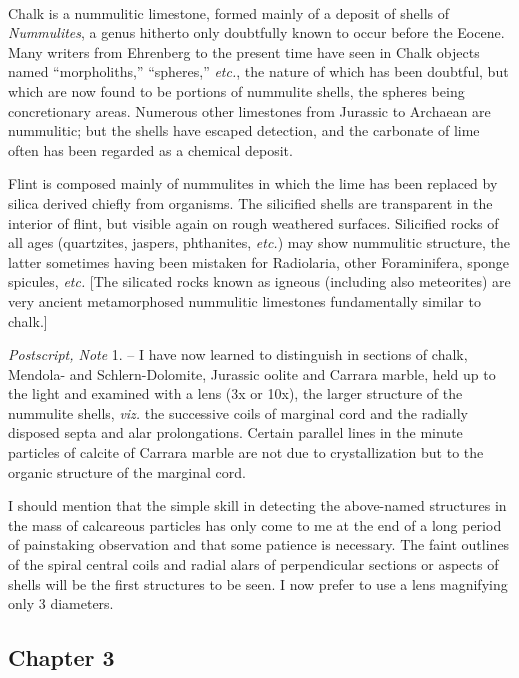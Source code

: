 \documentclass[a4paper, 12pt, oneside]{article}
\begin{document}
\paragraph{}
Chalk is a nummulitic limestone, formed mainly of a deposit of shells of \emph{Nummulites}, a genus hitherto only doubtfully known to occur before the Eocene. Many writers from Ehrenberg to the present time have seen in Chalk objects named ``morpholiths,'' ``spheres,'' \emph{etc.}, the nature of which has been doubtful, but which are now found to be portions of nummulite shells, the spheres being concretionary areas. Numerous other limestones from Jurassic to Archaean are nummulitic; but the shells have escaped detection, and the carbonate of lime often has been regarded as a chemical deposit.

Flint is composed mainly of nummulites in which the lime has been replaced by silica derived chiefly from organisms. The silicified shells are transparent in the interior of flint, but visible again on rough weathered surfaces. Silicified rocks of all ages (quartzites, jaspers, phthanites, \emph{etc.}) may show nummulitic structure, the latter sometimes having been mistaken for Radiolaria, other Foraminifera, sponge spicules, \emph{etc.} [The silicated rocks known as igneous (including also meteorites) are very ancient metamorphosed nummulitic limestones fundamentally similar to chalk.]

\emph{Postscript, Note} 1. -- I have now learned to distinguish in sections of chalk, Mendola- and Schlern-Dolomite, Jurassic oolite and Carrara marble, held up to the light and examined with a lens (3x or 10x), the larger structure of the nummulite shells, \emph{viz.} the successive coils of marginal cord and the radially disposed septa and alar prolongations. Certain parallel lines in the minute particles of calcite of Carrara marble are not due to crystallization but to the organic structure of the marginal cord.

I should mention that the simple skill in detecting the above-named structures in the mass of calcareous particles has only come to me at the end of a long period of painstaking observation and that some patience is necessary. The faint outlines of the spiral central coils and radial alars of perpendicular sections or aspects of shells will be the first structures to be seen. I now prefer to use a lens magnifying only 3 diameters.
\clearpage
\subsection{Chapter 3}
\end{document}
